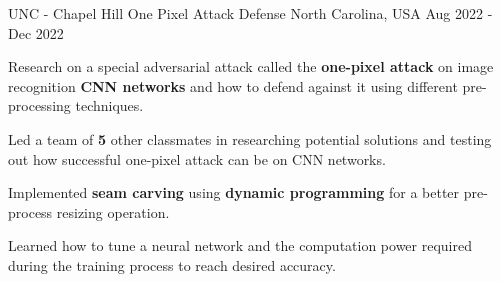 \begin{cventries}
  \cventry
    {UNC - Chapel Hill} %
    {One Pixel Attack Defense} %
    {North Carolina, USA} %
    {Aug 2022 - Dec 2022} %
    {
      \begin{cvitems} %
        \item {Research on a special adversarial attack called the \textbf{one-pixel attack} on image recognition \textbf{CNN networks} and how to defend against it using different pre-processing techniques.}
        \item {Led a team of \textbf{5} other classmates in researching potential solutions and testing out how successful one-pixel attack can be on CNN networks.}
        \item {Implemented \textbf{seam carving} using \textbf{dynamic programming} for a better pre-process resizing operation.}
        \item {Learned how to tune a neural network and the computation power required during the training process to reach desired accuracy.}
      \end{cvitems}
    }

\end{cventries}
